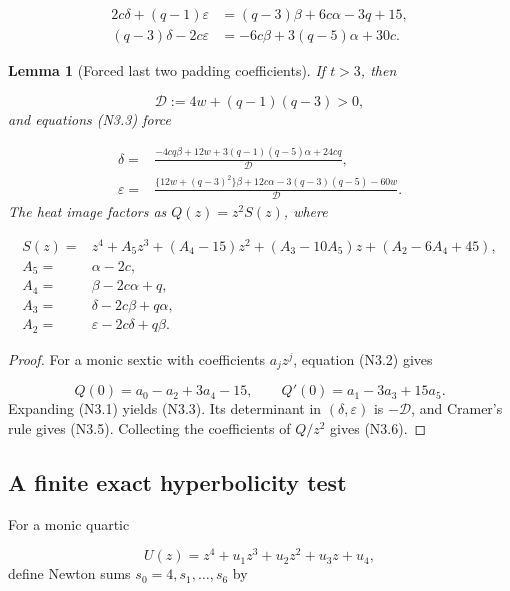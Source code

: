 \documentclass[11pt]{article}
\newtheorem{lemma}[theorem]{Lemma}
\theoremstyle{definition}
\theoremstyle{remark}
\begin{document}
\[
\begin{aligned}
 2c\delta+(q-1)\varepsilon
  &=(q-3)\beta+6c\alpha-3q+15,\\
 (q-3)\delta-2c\varepsilon
  &=-6c\beta+3(q-5)\alpha+30c.
\end{aligned}
\tag{N3.3}
\]

\begin{lemma}[Forced last two padding coefficients]
\label{lem:f2v3-elimination}
If \(t>3\), then

\[
 \mathcal D:=4w+(q-1)(q-3)>0,
 \tag{N3.4}
\]
and equations \textup{(N3.3)} force

\[
\boxed{
\begin{aligned}
\delta={}&\frac{-4cq\beta+{12w+3(q-1)(q-5)}\alpha+24cq}
                 {\mathcal D},\\
\varepsilon={}&\frac{\{12w+(q-3)^2\}\beta+12c\alpha
                 -3(q-3)(q-5)-60w}{\mathcal D}.
\end{aligned}}
\tag{N3.5}
\]
The heat image factors as \(Q(z)=z^2S(z)\), where

\[
\begin{aligned}
S(z)={}&z^4+A_5z^3+(A_4-15)z^2
 +(A_3-10A_5)z+(A_2-6A_4+45),\\
A_5={}&\alpha-2c,\\
A_4={}&\beta-2c\alpha+q,\\
A_3={}&\delta-2c\beta+q\alpha,\\
A_2={}&\varepsilon-2c\delta+q\beta.
\end{aligned}
\tag{N3.6}
\]
\end{lemma}

\begin{proof}
For a monic sextic with coefficients \(a_jz^j\), equation
\textup{(N3.2)} gives

\[
 Q(0)=a_0-a_2+3a_4-15,
 \qquad
 Q'(0)=a_1-3a_3+15a_5.
 \tag{N3.7}
\]
Expanding \textup{(N3.1)} yields \textup{(N3.3)}.  Its determinant in
\((\delta,\varepsilon)\) is \(-\mathcal D\), and Cramer's rule gives
\textup{(N3.5)}.  Collecting the coefficients of \(Q/z^2\) gives
\textup{(N3.6)}.
\end{proof}

\subsection{A finite exact hyperbolicity test}

For a monic quartic

\[
 U(z)=z^4+u_1z^3+u_2z^2+u_3z+u_4,
 \tag{N3.8}
\]
define Newton sums \(s_0=4,s_1,\ldots,s_6\) by
\end{document}
